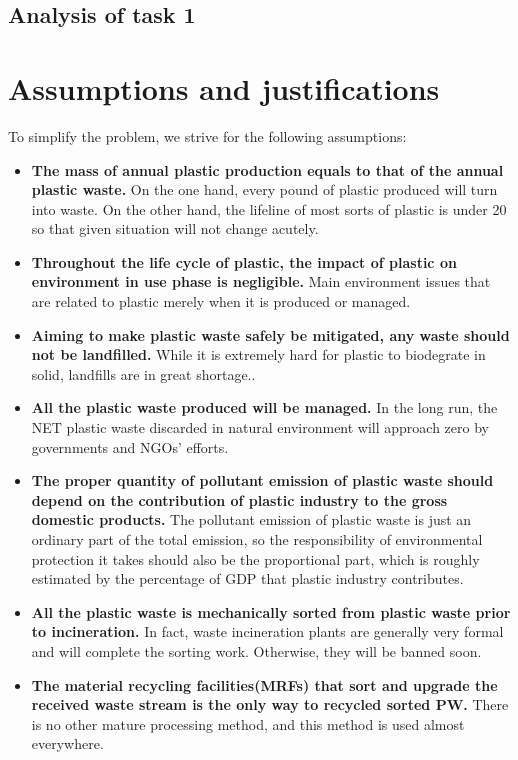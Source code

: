 \documentclass{mcmthesis}
\begin{document}
\subsection{Analysis of task 1}

\section{Assumptions and justifications}

To simplify the problem, we strive for the following assumptions:

\begin{itemize}
	
	\item \textbf{The mass of annual plastic production equals to that of the annual plastic waste.} On the one hand, every pound of plastic produced will turn into waste. On the other hand, the lifeline of most sorts of plastic is under 20 so that given situation will not change acutely\cite{Geyer}.
	
	\item \textbf{Throughout the life cycle of plastic, the impact of plastic on environment in use phase is negligible.} Main environment issues that are related to plastic merely when it is produced or managed\cite{book}.
	
	\item \textbf{Aiming to make plastic waste safely be mitigated, any waste should not be landfilled.} While it is extremely hard for plastic to biodegrate in solid, landfills are in great shortage.\cite{book}.
	
	\item \textbf{All the plastic waste produced will be managed.} In the long run, the NET plastic waste discarded in natural environment will approach zero by governments and NGOs’ efforts.
	
	\item \textbf{The proper quantity of pollutant emission of plastic waste should depend on the contribution of plastic industry to the gross domestic products.} The pollutant emission of plastic waste is just an ordinary part of the total emission, so the responsibility of environmental protection it takes should also be the proportional part, which is roughly estimated by the percentage of GDP that plastic industry contributes.
	
	\item \textbf{All the plastic waste is mechanically sorted from plastic waste prior to incineration.} In fact, waste incineration plants are generally very formal and will complete the sorting work. Otherwise, they will be banned soon.
	
	\item \textbf{The material recycling facilities(MRFs) that sort and upgrade the received waste stream is the only way to recycled sorted PW.} There is no other mature processing method, and this method is used almost everywhere.
	
\end{itemize}
\end{document}
